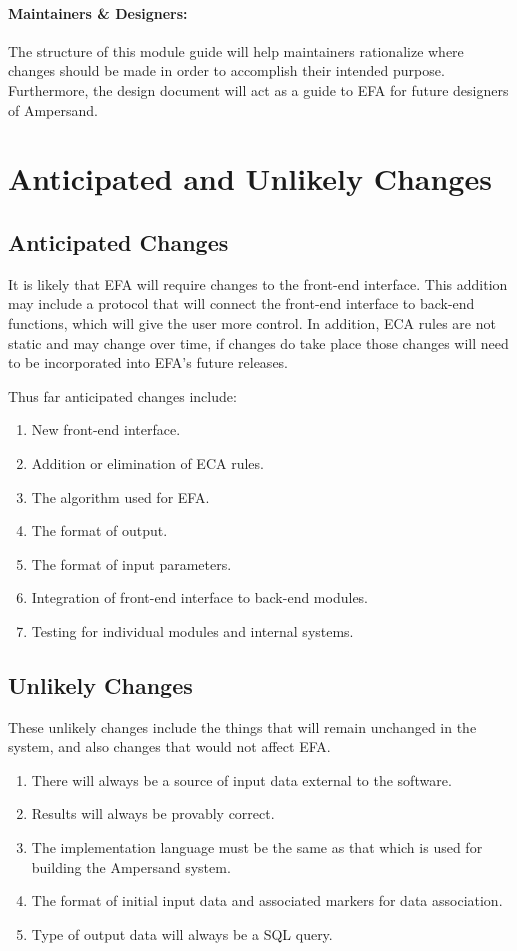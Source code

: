 \documentclass[12pt, svgnames]{article}
\let\Oldsubsection\subsection
\renewcommand{\subsection}{\FloatBarrier\Oldsubsection}
\begin{document}
\paragraph{Maintainers \& Designers:} The structure of this module guide will 
help maintainers rationalize where changes should be made in order to 
accomplish their intended purpose. Furthermore, the design document will act as 
a guide to EFA for future designers of Ampersand.

\section{Anticipated and Unlikely Changes}
\subsection{Anticipated Changes}
It is likely that EFA will require changes to the front-end interface. This 
addition may include a protocol that will connect the front-end interface to 
back-end functions, which will give the user more control. In addition, ECA 
rules are not static and may change over time, if changes do take place those 
changes will need to be incorporated into EFA's future releases. 

Thus far anticipated changes include:

\begin{enumerate}[label=\textbf{AC\arabic*:}]
    \item New front-end interface.
    \item Addition or elimination of ECA rules.
    \item The algorithm used for EFA.
    \item The format of output.
    \item The format of input parameters.
    \item Integration of front-end interface to back-end modules.
    \item Testing for individual modules and internal systems.
\end{enumerate}

\subsection{Unlikely Changes} 

These unlikely changes include the things that will remain unchanged in the 
system, and also changes that would not affect EFA. 

\begin{enumerate}[label=\textbf{UC\arabic*:}]
    \item There will always be a source of input data external to the 
    software.
    \item Results will always be provably correct.
    \item The implementation language must be the same as that which is 
    used for building the Ampersand system.
    \item The format of initial input data and associated markers for 
    data association.
    \item Type of output data will always be a SQL query.
\end{enumerate}
\end{document}
